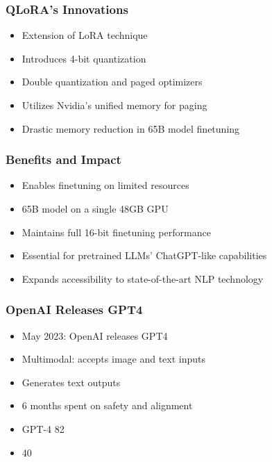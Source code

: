 \begin{frame}[fragile]\frametitle{QLoRA's Innovations}
    \begin{itemize}
        \item Extension of LoRA technique
        \item Introduces 4-bit quantization
        \item Double quantization and paged optimizers
        \item Utilizes Nvidia's unified memory for paging
        \item Drastic memory reduction in 65B model finetuning
    \end{itemize}
\end{frame}

\begin{frame}[fragile]\frametitle{Benefits and Impact}
    \begin{itemize}
        \item Enables finetuning on limited resources
        \item 65B model on a single 48GB GPU
        \item Maintains full 16-bit finetuning performance
        \item Essential for pretrained LLMs' ChatGPT-like capabilities
        \item Expands accessibility to state-of-the-art NLP technology
    \end{itemize}
\end{frame}

\begin{frame}[fragile]\frametitle{OpenAI Releases GPT4}
    \begin{itemize}
        \item May 2023: OpenAI releases GPT4
        \item Multimodal: accepts image and text inputs
        \item Generates text outputs
        \item 6 months spent on safety and alignment
        \item GPT-4 82%
        \item 40%
    \end{itemize}
\end{frame}


